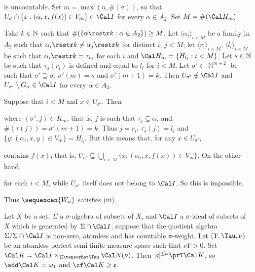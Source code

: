 {

\noindent is uncountable.   Set $m=\max(n,\#(\sigma))$, so that
$U_{\sigma}\cap\{x:(\alpha,x,f(x))\in V_m\}\in\Cal I$ for every
$\alpha\in A_2$.   Set $M=\#(\Cal H_m)$.

Take $k\in\Bbb N$ such that $\#(\{\alpha\restr k:\alpha\in A_2\})\ge M$.
Let $\langle\alpha_i\rangle_{i<M}$ be a family in $A_2$ such that
$\alpha_i\restr k\ne\alpha_j\restr k$ for distinct $i$, $j<M$;  let
$\langle r_i\rangle_{i<M}$, $\langle l_i\rangle_{i<M}$ be such that
$\alpha_i\restr k=\tau_{r_i}$ for each $i$ and
$\Cal H_m=\{H_{l_i}:i<M\}$.
Let $s\in\Bbb N$ be such that $\tau_s(r_i)$ is defined and equal to
$l_i$ for $i<M$.   Let $\sigma'\in\BbbN^{m+2}$ be such that
$\sigma'\supseteq\sigma$, $\sigma'(m)=s$ and $\sigma'(m+1)=k$.   Then
$U_{\sigma'}\notin\Cal I$ and
$U_{\sigma'}\setminus G_{\alpha}\in\Cal I$ for every $\alpha\in A_2$.

Suppose that $i<M$ and $x\in U_{\sigma'}$.   Then


\noindent where $(\sigma',j)\in K_m$, that is, $j$ is such that
$\tau_j\subseteq\alpha_i$ and $\#(\tau(j))=\sigma'(m+1)=k$.   Thus
$j=r_i$, $\tau_s(j)=l_i$ and
$\{y:(\alpha_i,x,y)\in V_m\}=H_{l_i}$.   But this means that, for any
$x\in U_{\sigma'}$,


\noindent contains $f(x)$;  that is,
$U_{\sigma'}\subseteq\bigcup_{i<M}\{x:(\alpha_i,x,f(x))\in V_m\}$.
On the other hand,


\noindent for each $i<M$, while $U_{\sigma'}$ itself does not belong to
$\Cal I$.   So this is impossible.\ \Bang

Thus $\sequencen{W_n}$ satisfies (iii).
}%

 Let $X$ be a set, $\Sigma$ a $\sigma$-algebra of
subsets of $X$, and $\Cal I$ a $\sigma$-ideal of subsets of $X$ which is
generated by $\Sigma\cap\Cal I$;  suppose that the quotient algebra
$\Sigma/\Sigma\cap\Cal I$ is non-zero, atomless and has countable
$\pi$-weight.
Let $(Y,\Tau,\nu)$ be an atomless perfect semi-finite measure space such that
$\nu Y>0$.    Set
$\Cal K=\Cal I\ltimes_{\Sigma\tensorhat\Tau}\Cal N(\nu)$.   Then
$[\frak c]^{\le\omega}\prT\Cal K$, so $\add\Cal K=\omega_1$ and
$\cf\Cal K\ge\frak c$.

